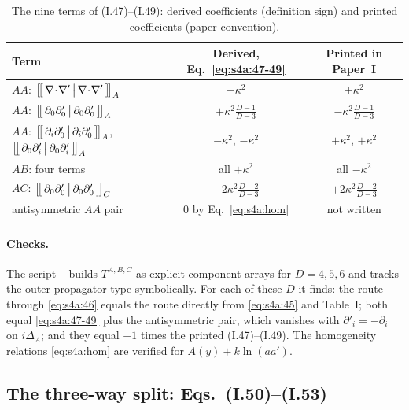 \documentclass[aps,prd,onecolumn,10pt,nofootinbib,floatfix]{revtex4-2}
\newcommand{\PI}{Paper~I}
\newcommand{\eqI}[1]{(I.#1)}
\begin{document}
\begin{table}[htbp]
\caption{The nine terms of \eqI{47}--\eqI{49}: derived coefficients (definition sign) and printed
coefficients (paper convention).}
\label{tab:s4a:47cmp}
\renewcommand{\arraystretch}{1.25}
\begin{ruledtabular}
\begin{tabular}{lcc}
Term & Derived, Eq.~\eqref{eq:s4a:47-49} & Printed in \PI\\
\hline
$AA$: $\big[\!\big[\,\nabla\!\cdot\!\nabla'\,\big|\,\nabla\!\cdot\!\nabla'\,\big]\!\big]_{A}$ & $-\kappa^2$ & $+\kappa^2$\\
$AA$: $\big[\!\big[\,\partial_0\partial'_0\,\big|\,\partial_0\partial'_0\,\big]\!\big]_{A}$ & $+\kappa^2\frac{D-1}{D-3}$ & $-\kappa^2\frac{D-1}{D-3}$\\
$AA$: $\big[\!\big[\,\partial_i\partial'_0\,\big|\,\partial_i\partial'_0\,\big]\!\big]_{A}$, $\big[\!\big[\,\partial_0\partial'_i\,\big|\,\partial_0\partial'_i\,\big]\!\big]_{A}$ & $-\kappa^2$, $-\kappa^2$ & $+\kappa^2$, $+\kappa^2$\\
$AB$: four terms & all $+\kappa^2$ & all $-\kappa^2$\\
$AC$: $\big[\!\big[\,\partial_0\partial'_0\,\big|\,\partial_0\partial'_0\,\big]\!\big]_{C}$ & $-2\kappa^2\frac{D-2}{D-3}$ & $+2\kappa^2\frac{D-2}{D-3}$\\
antisymmetric $AA$ pair & $0$ by Eq.~\eqref{eq:s4a:hom} & not written\\
\end{tabular}
\end{ruledtabular}
\end{table}

\paragraph*{Checks.}
The script ~\cite{ref:repo} builds $T^{A,B,C}$ as
explicit component arrays for $D=4,5,6$ and tracks the outer propagator type symbolically. For each of
these $D$ it finds: the route through \eqref{eq:s4a:46} equals the route directly from \eqref{eq:s4a:45}
and Table~I; both equal \eqref{eq:s4a:47-49} plus the antisymmetric pair, which vanishes with
$\partial'_i=-\partial_i$ on $i\Delta_A$; and they equal $-1$ times the printed \eqI{47}--\eqI{49}.
The homogeneity relations \eqref{eq:s4a:hom} are verified for $A(y)+k\ln(aa')$.

\subsection{The three-way split: Eqs.~(I.50)--(I.53)}
\label{sec:s4a:split}
\end{document}
